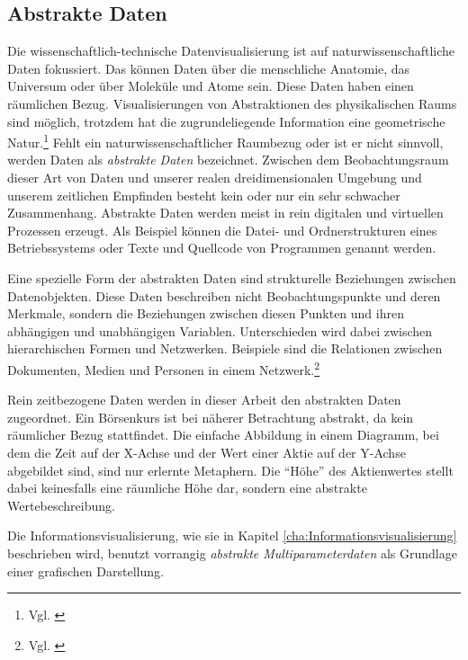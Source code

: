 \documentclass[a4paper, 12pt, DIV=calc, version=first, pdftex, headsepline, footsepline, bibtotocnumbered, liststotocnumbered]{scrreprt}
\begin{document}
\subsection{Abstrakte Daten}
Die wissenschaftlich-technische Datenvisualisierung ist auf naturwissenschaftliche Daten fokussiert.
Das können Daten über die menschliche Anatomie, das Universum oder über Moleküle und Atome sein. Diese Daten
haben einen räumlichen Bezug. Visualisierungen von Abstraktionen des physikalischen Raums
sind möglich, trotzdem hat die zugrundeliegende Information eine geometrische Natur.\footnote{Vgl. \citep[S.\,6]{Card}}
Fehlt ein naturwissenschaftlicher Raumbezug oder ist er nicht sinnvoll, werden Daten als \textit{abstrakte Daten} bezeichnet.
Zwischen dem Beobachtungsraum dieser Art von Daten und unserer realen dreidimensionalen Umgebung und unserem zeitlichen Empfinden
besteht kein oder nur ein sehr schwacher Zusammenhang.
Abstrakte Daten werden meist in rein digitalen und virtuellen Prozessen erzeugt. Als Beispiel
können die Datei- und Ordnerstrukturen eines Betriebssystems oder Texte und Quellcode von Programmen genannt werden.

Eine spezielle Form der abstrakten Daten sind strukturelle Beziehungen zwischen Datenobjekten.
Diese Daten beschreiben nicht Beobachtungspunkte und deren Merkmale, sondern die Beziehungen
zwischen diesen Punkten und ihren abhängigen und unabhängigen Variablen. Unterschieden wird dabei
zwischen hierarchischen Formen und Netzwerken. Beispiele sind die Relationen zwischen Dokumenten,
Medien und Personen in einem Netzwerk.\footnote{Vgl. \citep{Preim}}

Rein zeitbezogene Daten werden in dieser Arbeit den abstrakten Daten zugeordnet. Ein Börsenkurs ist bei näherer Betrachtung
abstrakt, da kein räumlicher Bezug stattfindet.
Die einfache Abbildung in einem Diagramm, bei dem die Zeit auf der X-Achse und der Wert einer Aktie auf der Y-Achse
abgebildet sind, sind nur erlernte Metaphern. Die "`Höhe"' des Aktienwertes stellt dabei keinesfalls eine räumliche
Höhe dar, sondern eine abstrakte Wertebeschreibung.

Die Informationsvisualisierung, wie sie in Kapitel \ref{cha:Informationsvisualisierung} beschrieben wird, benutzt
vorrangig \textit{abstrakte Multiparameterdaten} als Grundlage einer grafischen Darstellung.
\end{document}
